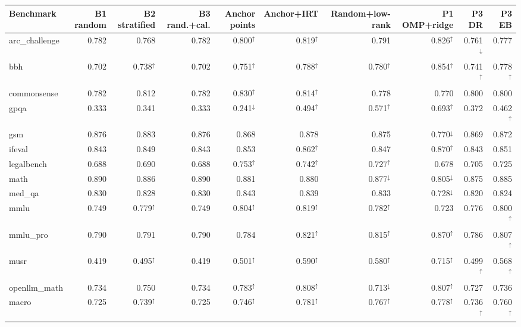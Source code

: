 {\scriptsize\setlength{\tabcolsep}{2.5pt}
\begin{tabular}{lrrrrrrrrr}
\toprule
Benchmark & B1 random & B2 stratified & B3 rand.+cal. & Anchor points & Anchor+IRT & Random+low-rank & P1 OMP+ridge & P3 DR & P3 EB \\
\midrule
arc\_challenge & 0.782 & 0.768 & 0.782 & 0.800$^{\uparrow}$ & 0.819$^{\uparrow}$ & 0.791 & 0.826$^{\uparrow}$ & 0.761$^{\downarrow}$ & 0.777 \\
bbh & 0.702 & 0.738$^{\uparrow}$ & 0.702 & 0.751$^{\uparrow}$ & 0.788$^{\uparrow}$ & 0.780$^{\uparrow}$ & 0.854$^{\uparrow}$ & 0.741$^{\uparrow}$ & 0.778$^{\uparrow}$ \\
commonsense & 0.782 & 0.812 & 0.782 & 0.830$^{\uparrow}$ & 0.814$^{\uparrow}$ & 0.778 & 0.770 & 0.800 & 0.800 \\
gpqa & 0.333 & 0.341 & 0.333 & 0.241$^{\downarrow}$ & 0.494$^{\uparrow}$ & 0.571$^{\uparrow}$ & 0.693$^{\uparrow}$ & 0.372 & 0.462$^{\uparrow}$ \\
gsm & 0.876 & 0.883 & 0.876 & 0.868 & 0.878 & 0.875 & 0.770$^{\downarrow}$ & 0.869 & 0.872 \\
ifeval & 0.843 & 0.849 & 0.843 & 0.853 & 0.862$^{\uparrow}$ & 0.847 & 0.870$^{\uparrow}$ & 0.843 & 0.851 \\
legalbench & 0.688 & 0.690 & 0.688 & 0.753$^{\uparrow}$ & 0.742$^{\uparrow}$ & 0.727$^{\uparrow}$ & 0.678 & 0.705 & 0.725 \\
math & 0.890 & 0.886 & 0.890 & 0.881 & 0.880 & 0.877$^{\downarrow}$ & 0.805$^{\downarrow}$ & 0.875 & 0.885 \\
med\_qa & 0.830 & 0.828 & 0.830 & 0.843 & 0.839 & 0.833 & 0.728$^{\downarrow}$ & 0.820 & 0.824 \\
mmlu & 0.749 & 0.779$^{\uparrow}$ & 0.749 & 0.804$^{\uparrow}$ & 0.819$^{\uparrow}$ & 0.782$^{\uparrow}$ & 0.723 & 0.776 & 0.800$^{\uparrow}$ \\
mmlu\_pro & 0.790 & 0.791 & 0.790 & 0.784 & 0.821$^{\uparrow}$ & 0.815$^{\uparrow}$ & 0.870$^{\uparrow}$ & 0.786 & 0.807$^{\uparrow}$ \\
musr & 0.419 & 0.495$^{\uparrow}$ & 0.419 & 0.501$^{\uparrow}$ & 0.590$^{\uparrow}$ & 0.580$^{\uparrow}$ & 0.715$^{\uparrow}$ & 0.499$^{\uparrow}$ & 0.568$^{\uparrow}$ \\
openllm\_math & 0.734 & 0.750 & 0.734 & 0.783$^{\uparrow}$ & 0.808$^{\uparrow}$ & 0.713$^{\downarrow}$ & 0.807$^{\uparrow}$ & 0.727 & 0.736 \\
\midrule
macro & 0.725 & 0.739$^{\uparrow}$ & 0.725 & 0.746$^{\uparrow}$ & 0.781$^{\uparrow}$ & 0.767$^{\uparrow}$ & 0.778$^{\uparrow}$ & 0.736$^{\uparrow}$ & 0.760$^{\uparrow}$ \\
\bottomrule
\end{tabular}}
